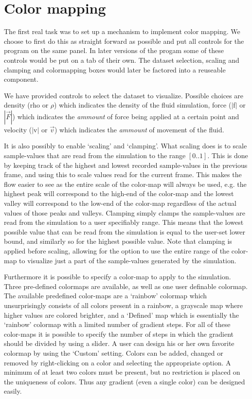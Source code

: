 \documentclass[a4paper,11pt,twoside]{report}
\begin{document}
	\section{Color mapping}
		The first real task was to set up a mechanism to implement color mapping. We choose to first do this as straight forward as possible and put all controls for the program on the same panel. In later versions of the progam some of these controls would be put on a tab of their own. The dataset selection, scaling and clamping and colormapping boxes would later be factored into a reuseable component.

		We have provided controls to select the dataset to visualize. Possible choices are density (rho or $\rho$) which indicates the density of the fluid simulation, force ($|$f$|$ or $|\overrightarrow{F}|$) which indicates the \emph{ammount} of force being applied at a certain point and velocity ($|$v$|$ or $\overrightarrow{v}$) which indicates the \emph{ammount} of movement of the fluid.

		It is also possibly to enable `scaling' and `clamping'. What scaling does is to scale sample-values that are read from the simulation to the range $[0..1]$. This is done by keeping track of the highest and lowest recorded sample-values in the previous frame, and using this to scale values read for the current frame. This makes the flow easier to see as the entire scale of the color-map will always be used, e.g. the highest peak will correspond to the high-end of the color-map and the lowest valley will correspond to the low-end of the color-map regardless of the actual values of those peaks and valleys.
		Clamping simply clamps the sample-values are read from the simulation to a user specifiably range. This means that the lowest possible value that can be read from the simulation is equal to the user-set lower bound, and similarly so for the highest possible value.
		Note that clamping is applied before scaling, allowing for the option to use the entire range of the color-map to visualize just a part of the sample-values generated by the simulation.

		Furthermore it is possible to specify a color-map to apply to the simulation. Three pre-defined colormaps are available, as well as one user definable colormap. The available predefined color-maps are a `rainbow' colormap which unsurprisingly consists of all colors present in a rainbow, a grayscale map where higher values are colored brighter, and a `Defined' map which is essentially the `rainbow' colormap with a limited number of gradient steps. For all of these color-maps it is possible to specify the number of steps in which the gradient should be divided by using a slider.
		A user can design his or her own favorite colormap by using the `Custom' setting. Colors can be added, changed or removed by right-clicking on a color and selecting the appropriate option. A minimum of at least two colors must be present, but no restriction is placed on the uniqueness of colors. Thus any gradient (even a single color) can be designed easily.
\end{document}
